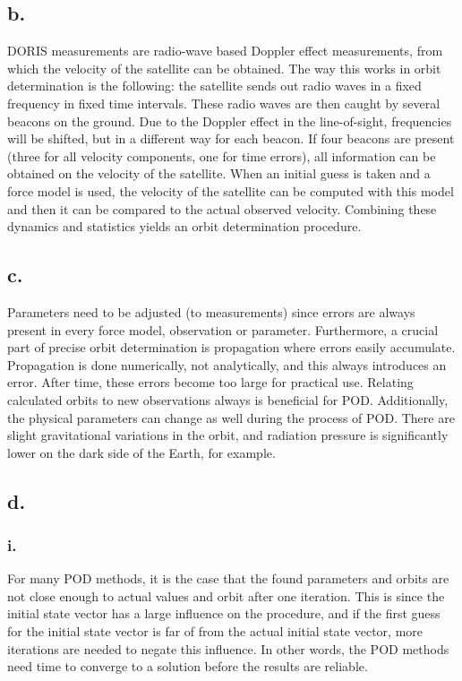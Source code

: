 \documentclass[a4paper,10pt,titlepage]{article}
\begin{document}
\subsection*{b.}
DORIS measurements are radio-wave based Doppler effect measurements, from which the velocity of the satellite can be obtained. The way this works in orbit determination is the following: the satellite sends out radio waves in a fixed frequency in fixed time intervals. These radio waves are then caught by several beacons on the ground. Due to the Doppler effect in the line-of-sight, frequencies will be shifted, but in a different way for each beacon. If four beacons are present (three for all velocity components, one for time errors), all information can be obtained on the velocity of the satellite. When an initial guess is taken and a force model is used, the velocity of the satellite can be computed with this model and then it can be compared to the actual observed velocity. Combining these dynamics and statistics yields an orbit determination procedure.
\subsection*{c.}
Parameters need to be adjusted (to measurements) since errors are always present in every force model, observation or parameter. Furthermore, a crucial part of precise orbit determination is propagation where errors easily accumulate. Propagation is done numerically, not analytically, and this always introduces an error. After time, these errors become too large for practical use. Relating calculated orbits to new observations always is beneficial for POD. Additionally, the physical parameters can change as well during the process of POD. There are slight gravitational variations in the orbit, and radiation pressure is significantly lower on the dark side of the Earth, for example.
\subsection*{d.}
\subsubsection*{i.}
For many POD methods, it is the case that the found parameters and orbits are not close enough to actual values and orbit after one iteration. This is since the initial state vector has a large influence on the procedure, and if the first guess for the initial state vector is far of from the actual initial state vector, more iterations are needed to negate this influence. In other words, the POD methods need time to converge to a solution before the results are reliable.
\end{document}
